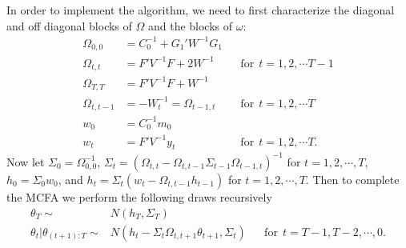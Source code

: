 \documentclass[graybox]{svmult}
\begin{document}
In order to implement the algorithm, we need to first characterize the diagonal and off diagonal blocks of $\Omega$ and the blocks of $\omega$:
\begin{align*}
  \Omega_{0,0} & = C_0^{-1} + G_1'W^{-1}G_1 && \\
  \Omega_{t,t} & = F'V^{-1}F + 2W^{-1} &&  \mathrm{ for }\ \  t=1,2,\cdots T-1\\
  \Omega_{T,T} & = F'V^{-1}F + W^{-1} && \\
  \Omega_{t,t-1} & = - W_t^{-1}=\Omega_{t-1,t} &&  \mathrm{ for }\ \  t=1,2,\cdots T\\
  w_0 & = C_0^{-1}m_0 &&\\
  w_t &= F'V^{-1}y_t &&  \mathrm{ for }\ \  t=1,2,\cdots T.
\end{align*}
Now let $\Sigma_0 = \Omega_{0,0}^{-1}$, $\Sigma_t = (\Omega_{t,t} - \Omega_{t,t-1}\Sigma_{t-1}\Omega_{t-1,t})^{-1}$ for $t=1,2,\cdots,T$, $h_0 = \Sigma_0w_0$, and $h_t = \Sigma_t(w_t - \Omega_{t,t-1}h_{t-1})$ for $t=1,2,\cdots,T$. Then to complete the MCFA we perform the following draws recursively
\begin{align*}
  \theta_T \sim & N(h_T, \Sigma_T) &&\\
  \theta_{t}|\theta_{(t+1):T} \sim & N(h_t - \Sigma_t\Omega_{t,t+1}\theta_{t+1}, \Sigma_t) && \mathrm{for}\ \ t=T-1,T-2,\cdots,0.
\end{align*}
\end{document}
